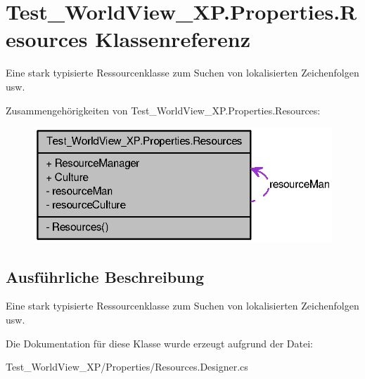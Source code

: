\hypertarget{class_test___world_view___x_p_1_1_properties_1_1_resources}{
\section{Test\_\-WorldView\_\-XP.Properties.Resources Klassenreferenz}
\label{class_test___world_view___x_p_1_1_properties_1_1_resources}
}


Eine stark typisierte Ressourcenklasse zum Suchen von lokalisierten Zeichenfolgen usw.  




Zusammengehörigkeiten von Test\_\-WorldView\_\-XP.Properties.Resources:\nopagebreak
\begin{figure}[H]
\begin{center}
\leavevmode
\includegraphics[width=319pt]{class_test___world_view___x_p_1_1_properties_1_1_resources__coll__graph}
\end{center}
\end{figure}


\subsection{Ausführliche Beschreibung}
Eine stark typisierte Ressourcenklasse zum Suchen von lokalisierten Zeichenfolgen usw. 

Die Dokumentation für diese Klasse wurde erzeugt aufgrund der Datei:\begin{DoxyCompactItemize}
\item 
Test\_\-WorldView\_\-XP/Properties/Resources.Designer.cs\end{DoxyCompactItemize}
